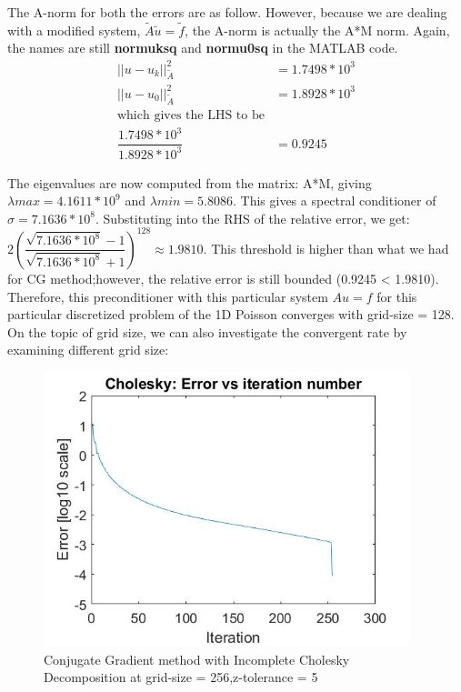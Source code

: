 \documentclass{article}
\begin{document}
\noindent
The A-norm for both the errors are as follow. However, because we are dealing with a modified system, $\tilde{A}\tilde{u}=\tilde{f}$, the A-norm is actually the A*M norm. Again, the names are still \textbf{normuksq} and \textbf{normu0sq} in the MATLAB code. 
\begin{align*}
	||u-u_k||_{\tilde{A}}^2 &= 1.7498*10^3 \\
	||u-u_0||_{\tilde{A}}^2 &= 1.8928*10^3  \\
	\textrm{which gives the LHS to be}\\
	\dfrac{1.7498*10^3}{1.8928*10^3} &=  0.9245
\end{align*}

\noindent
The eigenvalues are now computed from the matrix: A*M, giving $\lambda max = 4.1611*10^9$ and $\lambda min =  5.8086$. This gives a spectral conditioner of $\sigma = 7.1636*10^8$. Substituting into the RHS of the relative error, we get: $2\left(\dfrac{\sqrt{7.1636*10^8 }-1}{\sqrt{7.1636*10^8}+1} \right)^{128} \approx 1.9810$. This threshold is higher than what we had for CG method;however, the relative error is still bounded (0.9245 < 1.9810). Therefore, this preconditioner with this particular system $Au = f$ for this particular discretized problem of the 1D Poisson converges with grid-size = 128. On the topic of grid size, we can also investigate the convergent rate by examining different grid size: 


\begin{figure}[H]
	\includegraphics[width=\linewidth,height=80mm]{256.jpg}
	\caption{Conjugate Gradient method with Incomplete Cholesky Decomposition at grid-size = 256,z-tolerance = 5}	
\end{figure}
\end{document}
